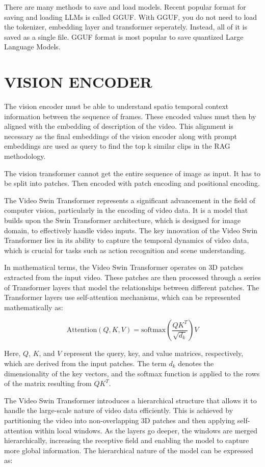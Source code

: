 \begin{spacing}{1.5}
\begin{sloppypar}
There are many methods to save and load models. Recent popular format for saving and loading LLMs is called GGUF. With GGUF, you do not need to load the tokenizer, embedding layer and transformer seperately. Instead, all of it is saved as a single file. GGUF format is most popular to save quantized Large Language Models.

\section{VISION ENCODER}

The vision encoder must be able to understand spatio temporal context information between the sequence of frames. These encoded values must then by aligned with the embedding of description of the video. This alignment is necessary as the final embeddings  of the vision encoder along with prompt embeddings are used as query to find the top k similar clips in the RAG methodology.  

The vision transformer cannot get the entire sequence of image as input. It has to be split into patches. Then encoded with patch encoding and positional encoding. 

The Video Swin Transformer represents a significant advancement in the field of computer vision, particularly in the encoding of video data. It is a model that builds upon the Swin Transformer architecture, which is designed for image domain, to effectively handle video inputs. The key innovation of the Video Swin Transformer lies in its ability to capture the temporal dynamics of video data, which is crucial for tasks such as action recognition and scene understanding.

In mathematical terms, the Video Swin Transformer operates on 3D patches extracted from the input video. These patches are then processed through a series of Transformer layers that model the relationships between different patches. The Transformer layers use self-attention mechanisms, which can be represented mathematically as:

$$
\text{Attention}(Q, K, V) = \text{softmax}\left(\frac{QK^T}{\sqrt{d_k}}\right)V
$$

Here, \( Q \), \( K \), and \( V \) represent the query, key, and value matrices, respectively, which are derived from the input patches. The term \( d_k \) denotes the dimensionality of the key vectors, and the softmax function is applied to the rows of the matrix resulting from \( QK^T \).

The Video Swin Transformer introduces a hierarchical structure that allows it to handle the large-scale nature of video data efficiently. This is achieved by partitioning the video into non-overlapping 3D patches and then applying self-attention within local windows. As the layers go deeper, the windows are merged hierarchically, increasing the receptive field and enabling the model to capture more global information. The hierarchical nature of the model can be expressed as:


\end{sloppypar}
\end{spacing}
